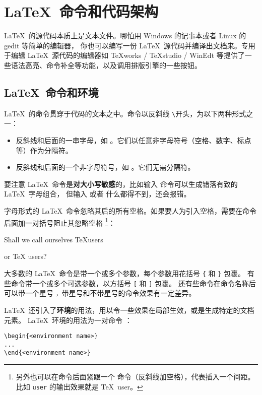 \section{\LaTeX\ 命令和代码架构}\label{sec:src}

\LaTeX\ 的源代码本质上是文本文件。哪怕用 Windows 的记事本或者 Linux 的 gedit 等简单的编辑器，
你也可以编写一份 \LaTeX\ 源代码并编译出文档来。专用于编辑 \LaTeX\ 源代码的编辑器如
TeXworks / TeXstudio / WinEdt 等提供了一些语法高亮、命令补全等功能，以及调用排版引擎的一些按钮。

\subsection{\LaTeX\ 命令和环境}\label{subsec:cmds}

\LaTeX\ 的命令贯穿于代码的文本之中。命令以反斜线 \texttt\textbackslash 开头，为以下两种形式之一：
\begin{itemize}
  \item 反斜线和后面的一串字母，如 。它们以任意非字母符号（空格、数字、标点等）作为分隔符。
  \item 反斜线和后面的一个非字母符号，如 \cmd{\$}。它们无需分隔符。
\end{itemize}

要注意 \LaTeX\ 命令是\textbf{对大小写敏感}的，比如输入  命令可以生成错落有致的 \LaTeX\ 字母组合，
但输入  或者  什么都得不到，还会报错。

字母形式的 \LaTeX\ 命令忽略其后的所有空格。如果要人为引入空格，需要在命令后面加一对括号阻止其忽略空格%
\footnote{另外也可以在命令后面紧跟一个 \cmd{\textvisiblespace} 命令（反斜线加空格），代表插入一个间距。
比如 \cmd{\textvisiblespace}\-\texttt{user} 的输出效果就是 \TeX\ user。}：
\begin{example}
Shall we call ourselves 
\TeX users 

or \TeX{} users?
\end{example}

大多数的 \LaTeX\ 命令是带一个或多个参数，每个参数用花括号 \texttt\{ 和 \texttt\} 包裹。
有些命令带一个或多个可选参数，以方括号 \texttt[ 和 \texttt] 包裹。
还有些命令在命令名称后可以带一个星号 \texttt*，带星号和不带星号的命令效果有一定差异。

\LaTeX\ 还引入了\textbf{环境}的用法，用以令一些效果在局部生效，或是生成特定的文档元素。
\LaTeX\ 环境的用法为一对命令  ：
\begin{verbatim}
\begin{<environment name>}
...
\end{<environment name>}
\end{verbatim}

